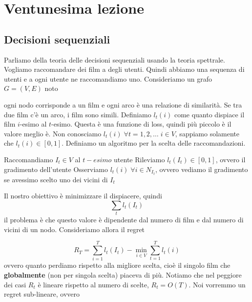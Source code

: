 \documentclass[12pt]{report}
\begin{document}
\chapter{Ventunesima lezione}

\section{Decisioni sequenziali}
Parliamo della teoria delle decisioni sequenziali usando la teoria spettrale. Vogliamo raccomandare dei film a degli utenti. Quindi abbiamo una sequenza di utenti e a ogni utente ne raccomandiamo uno. Consideriamo un grafo $G = (V,E)$ noto

ogni nodo corrisponde a un film e ogni arco è una relazione di similarità. Se tra due film c'è un arco, i film sono simili. Definiamo $l_t(i)$ come quanto dispiace il film $i$-esimo al $t$-esimo. Questa è una funzione di loss, quindi più piccolo è il valore meglio è. Non conosciamo $l_t(i) \; \forall t = 1,2,\dots \; i \in V$, sappiamo solamente che $l_t(i) \in [0,1]$. Definiamo un algoritmo per la scelta delle raccomandazioni.


\begin{algorithm}
\caption{}\label{euclid}
\begin{algorithmic}[1]
\State Raccomandiamo $I_t \in V$ al $t-esimo$ utente
\State Rileviamo $l_t(I_t) \in [0,1]$, ovvero il gradimento dell'utente
\State Osserviamo $l_t(i) \; \forall i \in N_{I_t}$, ovvero vediamo il gradimento se avessimo scelto uno dei vicini di $I_t$
\EndFor
\end{algorithmic}
\end{algorithm}

\noindent
Il nostro obiettivo è minimizzare il dispiacere, quindi
$$\sum_t l_t(I_t)$$
il problema è che questo valore è dipendente dal numero di film e dal numero di vicini di un nodo. Consideriamo allora il regret

$$R_T = \sum_{i=1}^T l_t(I_t) - \min_{i\in V} \sum_{t=1}^T l_t(i)$$
ovvero quanto perdiamo rispetto alla migliore scelta, cioè il singolo film che \textbf{globalmente} (non per singola scelta) piaceva di più. Notiamo che nel peggiore dei casi $R_t$ è lineare rispetto al numero di scelte, $R_t = O(T)$. Noi vorremmo un regret sub-lineare, ovvero
\end{document}
